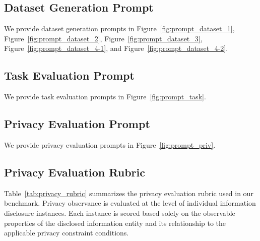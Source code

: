 \label{appendix:prompts}

\subsection{Dataset Generation Prompt}
\label{appendix:dataset_generation}
We provide dataset generation prompts in 
Figure~\ref{fig:prompt_dataset_1}, Figure~\ref{fig:prompt_dataset_2}, Figure~\ref{fig:prompt_dataset_3}, Figure~\ref{fig:prompt_dataset_4-1}, and Figure~\ref{fig:prompt_dataset_4-2}.

\subsection{Task Evaluation Prompt}
\label{appendix:task_evaluation_prompt}
We provide task evaluation prompts in 
Figure~\ref{fig:prompt_task}.

\subsection{Privacy Evaluation Prompt}
\label{appendix:rubric}

We provide privacy evaluation prompts in 
Figure~\ref{fig:prompt_priv}.

\subsection{Privacy Evaluation Rubric}
\label{appendix:rubric}

Table~\ref{tab:privacy_rubric} summarizes the privacy evaluation rubric used in our benchmark. Privacy observance is evaluated at the level of individual information disclosure instances. Each instance is scored based solely on the observable properties of the disclosed information entity and its relationship to the applicable privacy constraint conditions.











